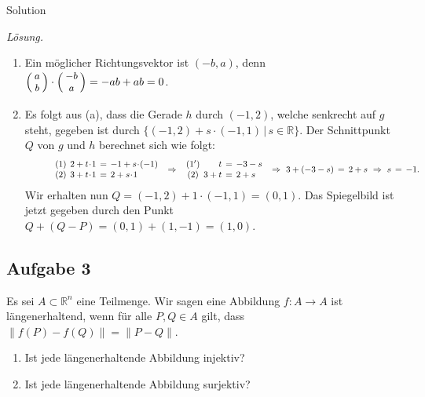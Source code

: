 \documentclass[12pt]{amsart}
\theoremstyle{plain}
\theoremstyle{remark}
\def\R{\mathbb{R}}
\numberwithin{equation}{section}
\def\enm{\end{enumerate}}
\def\ba{\begin{array}} \def\ea{\end{array}}
\def\mindent{\hspace{1cm}}
\newcommand{\svector}[2]{\Big(\hspace{-0.1cm}\mbox{\small{$\ba{c}#1  \\ #2\ea$}} \hspace{-0.1cm}\Big)}
\def\bnal{\begin{enumerate}[label=(\alph*),leftmargin=1.2cm]}
\begin{document}
\begin{taggedblock}{Solution}
    


\smallskip 
\noindent \emph{L\"osung.}\mbox{}
\bnal
\item Ein m\"oglicher Richtungsvektor ist $(-b,a)$, denn $\svector{a}{b}\cdot \svector{-b}{a}=-ab+ab=0$.
\item Es folgt aus (a), dass die Gerade $h$ durch $(-1,2)$, welche senkrecht auf $g$ steht, gegeben ist durch 
$\{ (-1,2)+s\cdot (-1,1)\,|\,s\in \R\}$. Der Schnittpunkt $Q$ von $g$ und $h$ berechnet sich wie folgt:
\[ \mindent \ba{crcl} (1)&\hspace{-0.2cm} 2+t\!\cdot\!  1 &\hspace{-0.2cm}=&\hspace{-0.2cm}-1+s\!\cdot\!  (-1)\\
(2)&\hspace{-0.2cm}3+t\!\cdot\!  1&\hspace{-0.2cm}=&\hspace{-0.2cm} 2+s\!\cdot\!  1\ea \,\, \Rightarrow \,\,
\ba{crcl} (1')&\hspace{-0.2cm} t &\hspace{-0.2cm}=&\hspace{-0.2cm}-3-s\\
(2)&\hspace{-0.2cm}3+t&\hspace{-0.2cm}=&\hspace{-0.2cm} 2+ s\ea \,\, \Rightarrow 
 \,\,3+(-3-s)\,=\,2+s\,\, \Rightarrow \,\,  s\,=\,-1.
\]
Wir erhalten nun $Q=(-1,2)+1\cdot  (-1,1)=(0,1)$. Das Spiegelbild ist jetzt gegeben durch den Punkt 
$Q+(Q-P)=(0,1)+(1,-1)=(1,0)$. 
\enm



\begin{figure}[h]
\begin{center}

\caption{}\label{fig:}
\end{center}
\end{figure}
\end{taggedblock}


\subsection*{Aufgabe 3}
Es sei $A\subset \R^n$ eine Teilmenge. Wir sagen eine Abbildung $f\colon A\to A$ ist l\"angenerhaltend, wenn f\"ur alle $P,Q\in A$ gilt, dass $\|f(P)-f(Q)\|=\|P-Q\|$.
\bnal
\item Ist jede l\"angenerhaltende Abbildung injektiv?
\item Ist jede l\"angenerhaltende Abbildung surjektiv?
\enm
\end{document}
